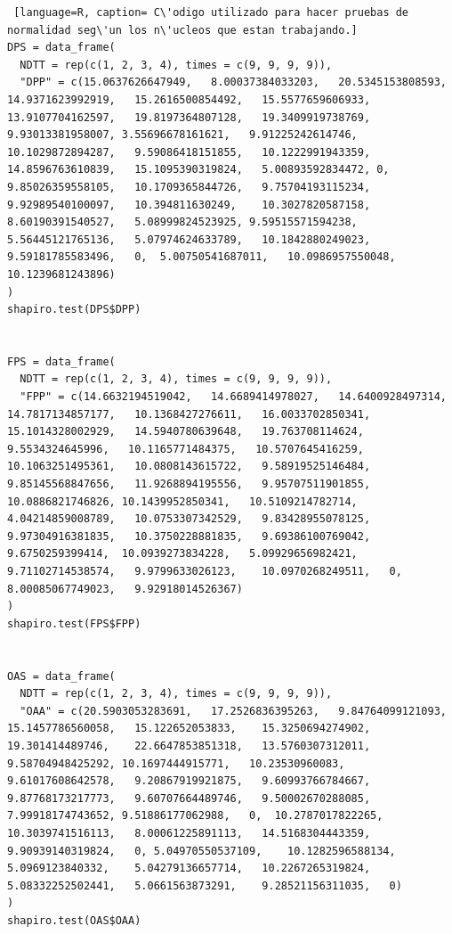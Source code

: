 \documentclass{article}
\begin{document}
\begin{lstlisting} [language=R, caption= C\'odigo utilizado para hacer pruebas de normalidad seg\'un los n\'ucleos que estan trabajando.]
DPS = data_frame(
  NDTT = rep(c(1, 2, 3, 4), times = c(9, 9, 9, 9)), 
  "DPP" = c(15.0637626647949,	8.00037384033203,	20.5345153808593,	14.9371623992919,	15.2616500854492,	15.5577659606933,	13.9107704162597,	19.8197364807128,	19.3409919738769, 9.93013381958007,	3.55696678161621,	9.91225242614746,	10.1029872894287,	9.59086418151855,	10.1222991943359,	14.8596763610839,	15.1095390319824,	5.00893592834472, 0,	9.85026359558105,	10.1709365844726,	9.75704193115234,	9.92989540100097,	10.394811630249,	10.3027820587158,	8.60190391540527,	5.08999824523925, 9.59515571594238,	5.56445121765136,	5.07974624633789,	10.1842880249023,	9.59181785583496,	0,	5.00750541687011,	10.0986957550048,	10.1239681243896)
)
shapiro.test(DPS$DPP)


FPS = data_frame(
  NDTT = rep(c(1, 2, 3, 4), times = c(9, 9, 9, 9)), 
  "FPP" = c(14.6632194519042,	14.6689414978027,	14.6400928497314,	14.7817134857177,	10.1368427276611,	16.0033702850341,	15.1014328002929,	14.5940780639648,	19.763708114624, 9.5534324645996,	10.1165771484375,	10.5707645416259,	10.1063251495361,	10.0808143615722,	9.58919525146484,	9.85145568847656,	11.9268894195556,	9.95707511901855, 10.0886821746826,	10.1439952850341,	10.5109214782714,	4.04214859008789,	10.0753307342529,	9.83428955078125,	9.97304916381835,	10.3750228881835,	9.69386100769042, 9.6750259399414,	10.0939273834228,	5.09929656982421,	9.71102714538574,	9.9799633026123,	10.0970268249511,	0,	8.00085067749023,	9.92918014526367)
)
shapiro.test(FPS$FPP)


OAS = data_frame(
  NDTT = rep(c(1, 2, 3, 4), times = c(9, 9, 9, 9)), 
  "OAA" = c(20.5903053283691,	17.2526836395263,	9.84764099121093,	15.1457786560058,	15.122652053833,	15.3250694274902,	19.301414489746,	22.6647853851318,	13.5760307312011, 9.58704948425292,	10.1697444915771,	10.23530960083,	9.61017608642578,	9.20867919921875,	9.60993766784667,	9.87768173217773,	9.60707664489746,	9.50002670288085, 7.99918174743652,	9.51886177062988,	0,	10.2787017822265,	10.3039741516113,	8.00061225891113,	14.5168304443359,	9.90939140319824,	0, 5.04970550537109,	10.1282596588134,	5.0969123840332,	5.04279136657714,	10.2267265319824,	5.08332252502441,	5.0661563873291,	9.28521156311035,	0)
)
shapiro.test(OAS$OAA)
\end{lstlisting}
\end{document}
